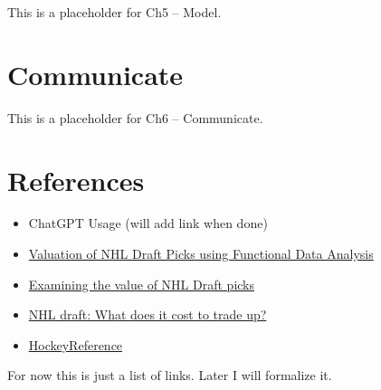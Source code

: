 \documentclass[
  letterpaper,
  DIV=11,
  numbers=noendperiod]{scrreprt}
\newlength{\cslhangindent}
\newenvironment{CSLReferences}[2] %
 {\begin{list}{}{%
  \setlength{\itemindent}{0pt}
  \setlength{\leftmargin}{0pt}
  \setlength{\parsep}{0pt}
  \ifodd #1
   \setlength{\leftmargin}{\cslhangindent}
   \setlength{\itemindent}{-1\cslhangindent}
  \fi
  \setlength{\itemsep}{#2\baselineskip}}}
 {\end{list}}
\begin{document}
This is a placeholder for Ch5 -- Model.


\chapter{Communicate}\label{communicate}

This is a placeholder for Ch6 -- Communicate.


\chapter*{References}\label{references}


\label{refs}
\begin{CSLReferences}{0}{1}
\begin{itemize}
\item
  ChatGPT Usage (will add link when done)
\item
  \href{https://summit.sfu.ca/_flysystem/fedora/2023-02/etd22223.pdf}{Valuation
  of NHL Draft Picks using Functional Data Analysis}
\item
  \href{https://soundofhockey.com/2022/06/06/examining-the-value-of-nhl-draft-picks/amp/}{Examining
  the value of NHL Draft picks}
\item
  \href{https://www.broadstreethockey.com/post/nhl-draft-pick-value-trading-up/}{NHL
  draft: What does it cost to trade up?}
\item
  \href{https://www.hockey-reference.com/draft/}{HockeyReference}
\end{itemize}

\end{CSLReferences}

For now this is just a list of links. Later I will formalize it.
\end{document}
